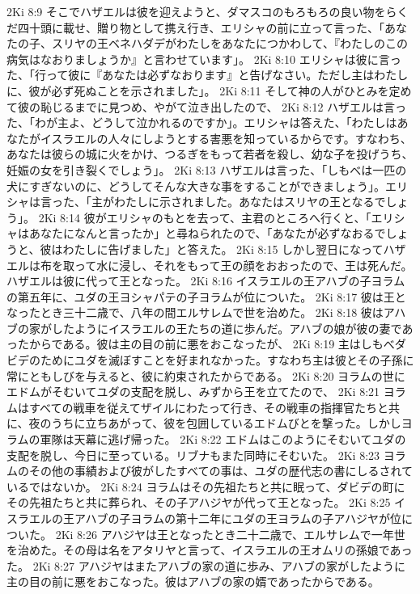 2Ki 8:9  そこでハザエルは彼を迎えようと、ダマスコのもろもろの良い物をらくだ四十頭に載せ、贈り物として携え行き、エリシャの前に立って言った、「あなたの子、スリヤの王ベネハダデがわたしをあなたにつかわして、『わたしのこの病気はなおりましょうか』と言わせています」。
2Ki 8:10  エリシャは彼に言った、「行って彼に『あなたは必ずなおります』と告げなさい。ただし主はわたしに、彼が必ず死ぬことを示されました」。
2Ki 8:11  そして神の人がひとみを定めて彼の恥じるまでに見つめ、やがて泣き出したので、
2Ki 8:12  ハザエルは言った、「わが主よ、どうして泣かれるのですか」。エリシャは答えた、「わたしはあなたがイスラエルの人々にしようとする害悪を知っているからです。すなわち、あなたは彼らの城に火をかけ、つるぎをもって若者を殺し、幼な子を投げうち、妊娠の女を引き裂くでしょう」。
2Ki 8:13  ハザエルは言った、「しもべは一匹の犬にすぎないのに、どうしてそんな大きな事をすることができましょう」。エリシャは言った、「主がわたしに示されました。あなたはスリヤの王となるでしょう」。
2Ki 8:14  彼がエリシャのもとを去って、主君のところへ行くと、「エリシャはあなたになんと言ったか」と尋ねられたので、「あなたが必ずなおるでしょうと、彼はわたしに告げました」と答えた。
2Ki 8:15  しかし翌日になってハザエルは布を取って水に浸し、それをもって王の顔をおおったので、王は死んだ。ハザエルは彼に代って王となった。
2Ki 8:16  イスラエルの王アハブの子ヨラムの第五年に、ユダの王ヨシャパテの子ヨラムが位についた。
2Ki 8:17  彼は王となったとき三十二歳で、八年の間エルサレムで世を治めた。
2Ki 8:18  彼はアハブの家がしたようにイスラエルの王たちの道に歩んだ。アハブの娘が彼の妻であったからである。彼は主の目の前に悪をおこなったが、
2Ki 8:19  主はしもべダビデのためにユダを滅ぼすことを好まれなかった。すなわち主は彼とその子孫に常にともしびを与えると、彼に約束されたからである。
2Ki 8:20  ヨラムの世にエドムがそむいてユダの支配を脱し、みずから王を立てたので、
2Ki 8:21  ヨラムはすべての戦車を従えてザイルにわたって行き、その戦車の指揮官たちと共に、夜のうちに立ちあがって、彼を包囲しているエドムびとを撃った。しかしヨラムの軍隊は天幕に逃げ帰った。
2Ki 8:22  エドムはこのようにそむいてユダの支配を脱し、今日に至っている。リブナもまた同時にそむいた。
2Ki 8:23  ヨラムのその他の事績および彼がしたすべての事は、ユダの歴代志の書にしるされているではないか。
2Ki 8:24  ヨラムはその先祖たちと共に眠って、ダビデの町にその先祖たちと共に葬られ、その子アハジヤが代って王となった。
2Ki 8:25  イスラエルの王アハブの子ヨラムの第十二年にユダの王ヨラムの子アハジヤが位についた。
2Ki 8:26  アハジヤは王となったとき二十二歳で、エルサレムで一年世を治めた。その母は名をアタリヤと言って、イスラエルの王オムリの孫娘であった。
2Ki 8:27  アハジヤはまたアハブの家の道に歩み、アハブの家がしたように主の目の前に悪をおこなった。彼はアハブの家の婿であったからである。
